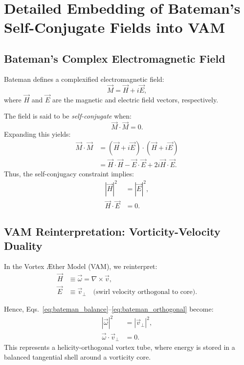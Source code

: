 \documentclass[12pt]{article}
\begin{document}
\section{Detailed Embedding of Bateman's Self-Conjugate Fields into VAM}
\label{appendix:bateman_vam}

\subsection*{Bateman's Complex Electromagnetic Field}

Bateman defines a complexified electromagnetic field:\cite{bateman1915aether}
\begin{equation}
    \vec{M} = \vec{H} + i\vec{E},
\end{equation}
where $\vec{H}$ and $\vec{E}$ are the magnetic and electric field vectors, respectively.

The field is said to be \textit{self-conjugate} when:
\begin{equation}
    \vec{M} \cdot \vec{M} = 0. \label{eq:bateman_self_conj}
\end{equation}
Expanding this yields:\cite{bateman1915aether}
\begin{align}
    \vec{M} \cdot \vec{M} &= (\vec{H} + i\vec{E}) \cdot (\vec{H} + i\vec{E}) \\
    &= \vec{H} \cdot \vec{H} - \vec{E} \cdot \vec{E} + 2i \vec{H} \cdot \vec{E}.
\end{align}
Thus, the self-conjugacy constraint implies:
\begin{align}
    |\vec{H}|^2 &= |\vec{E}|^2, \label{eq:bateman_balance} \\
    \vec{H} \cdot \vec{E} &= 0. \label{eq:bateman_orthogonal}
\end{align}

\subsection{VAM Reinterpretation: Vorticity-Velocity Duality}

In the Vortex Æther Model (VAM), we reinterpret:\cite{iskandarani2025swirlgravity}
\begin{align*}
    \vec{H} &\equiv \vec{\omega} = \nabla \times \vec{v}, \\
    \vec{E} &\equiv \vec{v}_\perp \quad \text{(swirl velocity orthogonal to core)}.
\end{align*}

Hence, Eqs.~\eqref{eq:bateman_balance}--\eqref{eq:bateman_orthogonal} become:
\begin{align}
    |\vec{\omega}|^2 &= |\vec{v}_\perp|^2, \label{eq:vam_balance} \\
    \vec{\omega} \cdot \vec{v}_\perp &= 0. \label{eq:vam_orthogonal}
\end{align}
This represents a helicity-orthogonal vortex tube, where energy is stored in a balanced tangential shell around a vorticity core.
\end{document}
